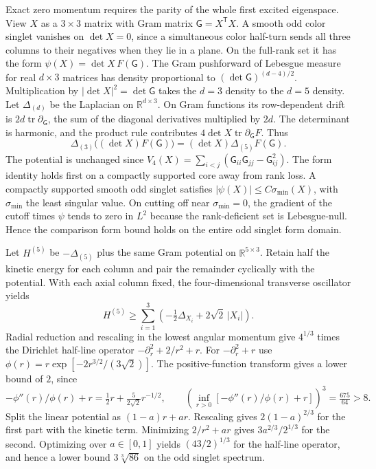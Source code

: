 \documentclass[11pt,a4paper]{article}
\numberwithin{equation}{section}
\begin{document}
Exact zero momentum requires the parity of the whole first excited eigenspace. View \(X\) as a \(3\times3\) matrix with Gram matrix \(\mathsf G=X^{\mathsf T}X\). A smooth odd color singlet vanishes on \(\det X=0\), since a simultaneous color half-turn sends all three columns to their negatives when they lie in a plane. On the full-rank set it has the form \(\psi(X)=\det X\,F(\mathsf G)\). The Gram pushforward of Lebesgue measure for real \(d\times3\) matrices has density proportional to \((\det\mathsf G)^{(d-4)/2}\). Multiplication by \(|\det X|^2=\det\mathsf G\) takes the \(d=3\) density to the \(d=5\) density. Let \(\Delta_{(d)}\) be the Laplacian on \(\mathbb R^{d\times3}\). On Gram functions its row-dependent drift is \(2d\operatorname{tr}\partial_{\mathsf G}\), the sum of the diagonal derivatives multiplied by \(2d\). The determinant is harmonic, and the product rule contributes \(4\det X\operatorname{tr}\partial_{\mathsf G}F\). Thus
\[
 \Delta_{(3)}\big((\det X)F(\mathsf G)\big)=(\det X)\Delta_{(5)}F(\mathsf G).
\]
The potential is unchanged since \(V_4(X)=\sum_{i<j}(\mathsf G_{ii}\mathsf G_{jj}-\mathsf G_{ij}^2)\). The form identity holds first on a compactly supported core away from rank loss. A compactly supported smooth odd singlet satisfies \(|\psi(X)|\le C\sigma_{\min}(X)\), with \(\sigma_{\min}\) the least singular value. On cutting off near \(\sigma_{\min}=0\), the gradient of the cutoff times \(\psi\) tends to zero in \(L^2\) because the rank-deficient set is Lebesgue-null. Hence the comparison form bound holds on the entire odd singlet form domain.

Let \(H^{(5)}\) be \(-\Delta_{(5)}\) plus the same Gram potential on \(\mathbb R^{5\times3}\). Retain half the kinetic energy for each column and pair the remainder cyclically with the potential. With each axial column fixed, the four-dimensional transverse oscillator yields
\[
 H^{(5)}\ge \sum_{i=1}^3\left(-\tfrac12\Delta_{X_i}+2\sqrt 2\,|X_i|\right).
\]
Radial reduction and rescaling in the lowest angular momentum give \(4^{1/3}\) times the Dirichlet half-line operator \(-\partial_r^2+2/r^2+r\). For \(-\partial_r^2+r\) use \(\phi(r)=r\exp[-2r^{3/2}/(3\sqrt2)]\). The positive-function transform gives a lower bound of \(2\), since
\[
 -\phi''(r)/\phi(r)+r=\tfrac12 r+\tfrac5{2\sqrt2}r^{-1/2},\qquad
 \left(\inf_{r>0}[-\phi''(r)/\phi(r)+r]\right)^3=\tfrac{675}{64}>8.
\]
Split the linear potential as \((1-a)r+ar\). Rescaling gives \(2(1-a)^{2/3}\) for the first part with the kinetic term. Minimizing \(2/r^2+ar\) gives \(3a^{2/3}/2^{1/3}\) for the second. Optimizing over \(a\in[0,1]\) yields \((43/2)^{1/3}\) for the half-line operator, and hence a lower bound \(3\sqrt[3]{86}\) on the odd singlet spectrum.
\end{document}
